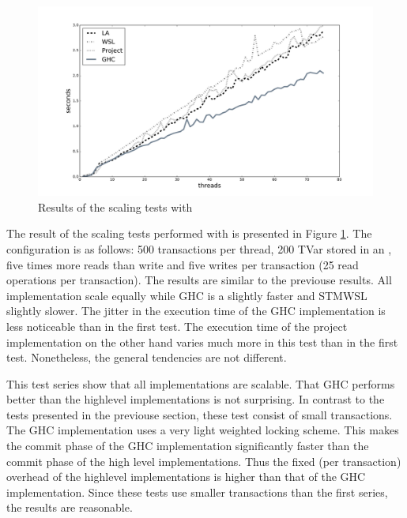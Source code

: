 \begin{figure}
 \centering
 \includegraphics[scale=0.35]{Figures/Scaling2}
\caption[Runtime: Scaling Test II]{Results of the scaling tests with }
\label{fig:scaling2}
\end{figure}

The result of the scaling tests performed with  is presented in Figure \ref{fig:scaling2}. The configuration 
is as follows: 500 transactions per thread, 200 TVar stored in an , five times more reads than write and
five writes per transaction (25 read operations per transaction). The results are similar to the previouse results. All implementation scale equally while
GHC is a slightly faster and STMWSL slightly slower. The jitter in the execution time of the GHC implementation is less noticeable than 
in the first test. The execution time of the project implementation on the other hand varies much more in this test than
in the first test. Nonetheless, the general tendencies are not different. 

This test series show that all implementations are scalable. That GHC performs better than the highlevel implementations
is not surprising. In contrast to the tests presented in the previouse section, these test consist of small transactions.
The GHC implementation uses a very light weighted locking scheme. This makes the commit phase of the GHC implementation
significantly faster than the commit phase of the high level implementations. Thus the fixed (per transaction) overhead
of the highlevel implementations is higher than that of the GHC implementation. Since these tests use smaller transactions
than the first series, the results are reasonable.

